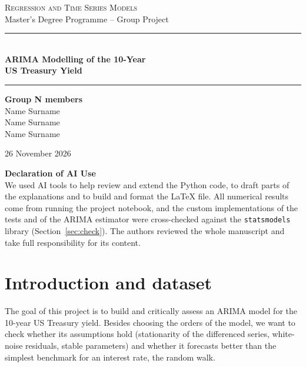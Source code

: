 \documentclass[11pt,a4paper]{article}
\begin{document}
\begin{titlepage}
\centering
\vspace*{3cm}
{\large\textsc{Regression and Time Series Models}}\\[0.8em]
{\normalsize Master's Degree Programme -- Group Project}

\vspace{3.5cm}
\rule{\textwidth}{0.6pt}\\[1em]
{\LARGE\bfseries ARIMA Modelling of the 10-Year\\[0.3em] US Treasury Yield}\\[0.8em]
\rule{\textwidth}{0.6pt}

\vspace{3cm}
{\large\bfseries Group N members}\\[0.8em]
{\large Name Surname}\\[0.4em]
{\large Name Surname}\\[0.4em]
{\large Name Surname}

\vfill
{\large 26 November 2026}
\end{titlepage}

\setcounter{page}{1}
\noindent\textbf{\large Declaration of AI Use}\\[0.3em]
We used AI tools to help review and extend the Python code, to draft parts of the explanations and to build and format the \LaTeX{} file. All numerical results come from running the project notebook, and the custom implementations of the tests and of the ARIMA estimator were cross-checked against the \texttt{statsmodels} library (Section~\ref{sec:check}). The authors reviewed the whole manuscript and take full responsibility for its content.

\newpage
\tableofcontents
\newpage

\section{Introduction and dataset}

The goal of this project is to build and critically assess an ARIMA model for the 10-year US Treasury yield. Besides choosing the orders of the model, we want to check whether its assumptions hold (stationarity of the differenced series, white-noise residuals, stable parameters) and whether it forecasts better than the simplest benchmark for an interest rate, the random walk.
\end{document}
